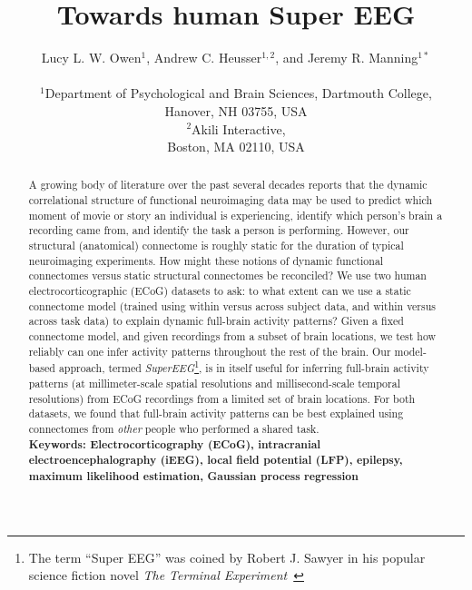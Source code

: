 \documentclass[12pt]{article}
\title{Towards human Super EEG}
\author
{Lucy L. W. Owen$^{1}$, Andrew C. Heusser$^{1, 2}$, and Jeremy R. Manning$^{1\ast}$\\\\
$^{1}$Department of Psychological and Brain Sciences, Dartmouth College,\\
Hanover, NH 03755, USA\\
$^{2}$Akili Interactive,\\
Boston, MA 02110, USA}
\date{}
\begin{document}
 


\baselineskip24pt


\maketitle 

\begin{abstract}
A growing body of literature over the past several decades reports that the dynamic correlational structure of functional neuroimaging data may be used to predict which moment of movie or story an individual is experiencing, identify which person's brain a recording came from, and identify the task a person is performing.  However, our structural (anatomical) connectome is roughly static for the duration of typical neuroimaging experiments.  How might these notions of dynamic functional connectomes versus static structural connectomes be reconciled?  We use two human electrocorticographic (ECoG) datasets to ask: to what extent can we use a static connectome model (trained using within versus across subject data, and within versus across task data) to explain dynamic full-brain activity patterns?  Given a fixed connectome model, and given recordings from a subset of brain locations, we test how reliably can one infer activity patterns throughout the rest of the brain.  Our model-based approach, termed \textit{SuperEEG}\footnote{The term ``Super EEG'' was
coined by Robert J. Sawyer in his popular science fiction novel
\textit{The Terminal Experiment}~\cite{Sawy95}}, is in itself useful for inferring full-brain activity patterns (at millimeter-scale spatial resolutions and millisecond-scale temporal resolutions) from ECoG recordings from a limited set of brain locations.  For both datasets, we found that full-brain activity patterns can be best explained using connectomes from \textit{other} people who performed a shared task.\\

\small{\textbf{Keywords: Electrocorticography (ECoG), intracranial electroencephalography (iEEG),
local field potential (LFP), epilepsy, maximum likelihood estimation, Gaussian process regression}}
\end{abstract}
\end{document}
